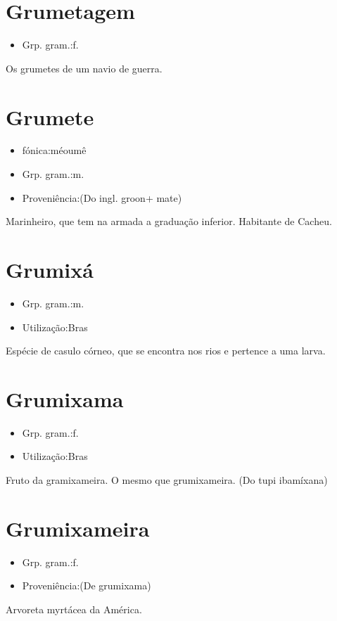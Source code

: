 \section{Grumetagem}
\begin{itemize}
\item {Grp. gram.:f.}
\end{itemize}
Os grumetes de um navio de guerra.
\section{Grumete}
\begin{itemize}
\item {fónica:méoumê}
\end{itemize}
\begin{itemize}
\item {Grp. gram.:m.}
\end{itemize}
\begin{itemize}
\item {Proveniência:(Do ingl. \textunderscore groon\textunderscore  + \textunderscore mate\textunderscore )}
\end{itemize}
Marinheiro, que tem na armada a graduação inferior.
Habitante de Cacheu.
\section{Grumixá}
\begin{itemize}
\item {Grp. gram.:m.}
\end{itemize}
\begin{itemize}
\item {Utilização:Bras}
\end{itemize}
Espécie de casulo córneo, que se encontra nos rios e pertence a uma larva.
\section{Grumixama}
\begin{itemize}
\item {Grp. gram.:f.}
\end{itemize}
\begin{itemize}
\item {Utilização:Bras}
\end{itemize}
Fruto da gramixameira.
O mesmo que \textunderscore grumixameira\textunderscore .
(Do tupi \textunderscore ibamíxana\textunderscore )
\section{Grumixameira}
\begin{itemize}
\item {Grp. gram.:f.}
\end{itemize}
\begin{itemize}
\item {Proveniência:(De \textunderscore grumixama\textunderscore )}
\end{itemize}
Arvoreta myrtácea da América.
